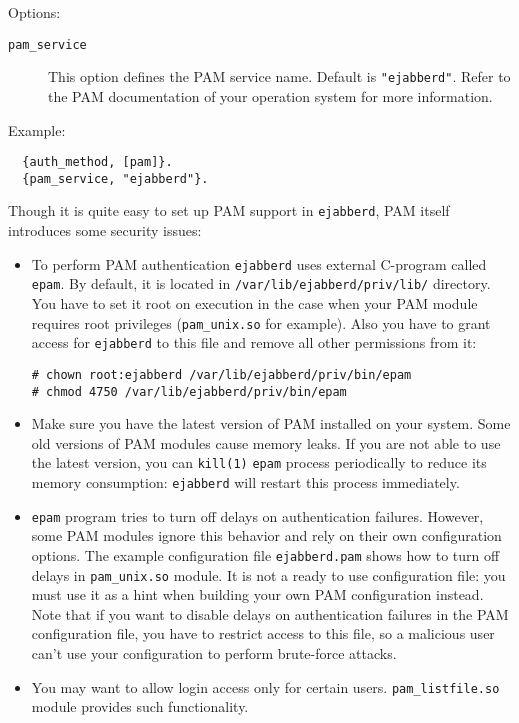 \documentclass[a4paper,10pt]{book}
\newcommand{\ind}[1]{\begin{latexonly}\index{#1}\end{latexonly}}
\newcommand{\bracehack}{\def\{{\char"7B}\def\}{\char"7D}}
\newcommand{\titem}[1]{\item[\bracehack\texttt{#1}]}
\newcommand{\term}[1]{\texttt{#1}}
\newcommand{\ejabberd}{\texttt{ejabberd}}
\begin{document}
Options:
\begin{description}
\titem{pam\_service}\ind{options!pam\_service}This option defines the PAM service name.
Default is \term{"ejabberd"}. Refer to the PAM documentation of your operation system
for more information.
\end{description}

Example:
\begin{verbatim}
  {auth_method, [pam]}.
  {pam_service, "ejabberd"}.
\end{verbatim}

Though it is quite easy to set up PAM support in \ejabberd{}, PAM itself introduces some
security issues:

\begin{itemize}
\item To perform PAM authentication \ejabberd{} uses external C-program called
\term{epam}. By default, it is located in \verb|/var/lib/ejabberd/priv/lib/|
directory. You have to set it root on execution in the case when your PAM module
requires root privileges (\term{pam\_unix.so} for example). Also you have to grant access
for \ejabberd{} to this file and remove all other permissions from it:
\begin{verbatim}
# chown root:ejabberd /var/lib/ejabberd/priv/bin/epam
# chmod 4750 /var/lib/ejabberd/priv/bin/epam
\end{verbatim}
\item Make sure you have the latest version of PAM installed on your system.
Some old versions of PAM modules cause memory leaks. If you are not able to use the latest
version, you can \term{kill(1)} \term{epam} process periodically to reduce its memory
consumption: \ejabberd{} will restart this process immediately.
\item \term{epam} program tries to turn off delays on authentication failures.
However, some PAM modules ignore this behavior and rely on their own configuration options.
The example configuration file \term{ejabberd.pam} shows how to turn off delays in
\term{pam\_unix.so} module. It is not a ready to use configuration file: you must use it
as a hint when building your own PAM configuration instead. Note that if you want to disable
delays on authentication failures in the PAM configuration file, you have to restrict access
to this file, so a malicious user can't use your configuration to perform brute-force
attacks.
\item You may want to allow login access only for certain users. \term{pam\_listfile.so}
module provides such functionality.
\end{itemize}
\end{document}
